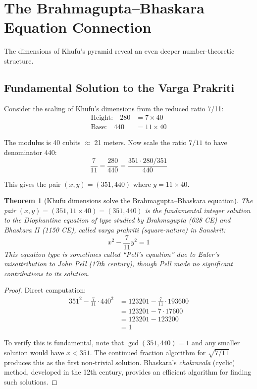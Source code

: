\documentclass[11pt]{article}
\newtheorem{theorem}{Theorem}
\theoremstyle{definition}
\theoremstyle{remark}
\begin{document}
\section{The Brahmagupta--Bhaskara Equation Connection}

The dimensions of Khufu's pyramid reveal an even deeper number-theoretic structure.

\subsection{Fundamental Solution to the Varga Prakriti}

Consider the scaling of Khufu's dimensions from the reduced ratio 7/11:
\begin{align*}
\text{Height:} \quad 280 &= 7 \times 40 \\
\text{Base:} \quad 440 &= 11 \times 40
\end{align*}

The modulus is 40 cubits $\approx$ 21 meters. Now scale the ratio $7/11$ to have denominator 440:
\[
\frac{7}{11} = \frac{280}{440} = \frac{351 \cdot 280/351}{440}
\]

This gives the pair $(x, y) = (351, 440)$ where $y = 11 \times 40$.

\begin{theorem}[Khufu dimensions solve the Brahmagupta--Bhaskara equation]
The pair $(x, y) = (351, 11 \times 40) = (351, 440)$ is the fundamental integer solution to the Diophantine equation of type studied by Brahmagupta (628 CE) and Bhaskara II (1150 CE), called \emph{varga prakriti} (square-nature) in Sanskrit:
\[
x^2 - \frac{7}{11} y^2 = 1
\]
This equation type is sometimes called ``Pell's equation'' due to Euler's misattribution to John Pell (17th century), though Pell made no significant contributions to its solution.
\end{theorem}

\begin{proof}
Direct computation:
\begin{align*}
351^2 - \frac{7}{11} \cdot 440^2 &= 123201 - \frac{7}{11} \cdot 193600 \\
&= 123201 - 7 \cdot 17600 \\
&= 123201 - 123200 \\
&= 1
\end{align*}

To verify this is fundamental, note that $\gcd(351, 440) = 1$ and any smaller solution would have $x < 351$. The continued fraction algorithm for $\sqrt{7/11}$ produces this as the first non-trivial solution. Bhaskara's \emph{chakravala} (cyclic) method, developed in the 12th century, provides an efficient algorithm for finding such solutions.
\end{proof}
\end{document}
